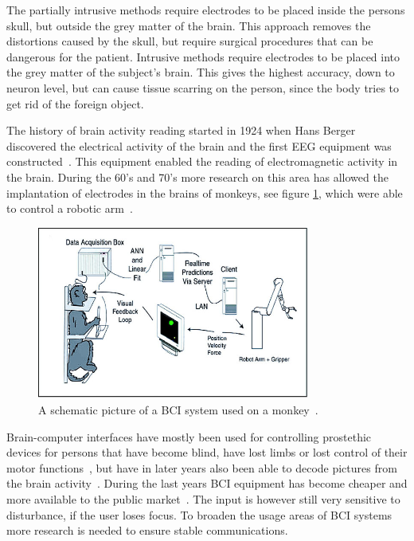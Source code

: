 The partially intrusive methods require electrodes to be placed inside the persons skull, but outside the grey matter of the brain. This approach removes the distortions caused by the skull, but require surgical procedures that can be dangerous for the patient. Intrusive methods require electrodes to be placed into the grey matter of the subject's brain. This gives the highest accuracy, down to neuron level, but can cause tissue scarring on the person, since the body tries to get rid of the foreign object.

The history of brain activity reading started in 1924 when Hans Berger discovered the electrical activity of the brain and the first EEG equipment was constructed~\cite{haas2003hans}. This equipment enabled the reading of electromagnetic activity in the brain. During the 60's and 70's more research on this area has allowed the implantation of electrodes in the brains of monkeys, see figure \ref{apa}, which were able to control a robotic arm~\cite{GeorgopoulosLuritoPetridesEtAl89,lebedev2005cortical}. 

\begin{figure}[]
\center
\includegraphics[width=0.8\textwidth] {bilder/apa.jpg}
\caption{A schematic picture of a BCI system used on a monkey~\cite{apa}.}
\label{apa}
\end{figure}

Brain-computer interfaces have mostly been used for controlling prostethic devices for persons that have become blind, have lost limbs or lost control of their motor functions~\cite{lebedev2006brain}, but have in later years also been able to decode pictures from the brain activity~\cite{miyawaki2008visual}.
During the last years BCI equipment has become cheaper and more available to the public market~\cite{legobrain}. The input is however still very sensitive to disturbance, if the user loses focus. To broaden the usage areas of BCI systems more research is needed to ensure stable communications.

